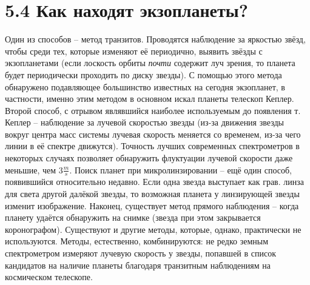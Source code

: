 \documentclass{article}
\begin{document}
\section*{5.4 Как находят экзопланеты?}
    Один из способов -- метод транзитов. Проводятся наблюдение за яркостью звёзд, чтобы среди тех, которые изменяют её периодично, выявить звёзды с экзопланетами (если лоскость орбиты \textit{почти} содержит луч зрения, то планета будет периодически проходить по диску звезды). С помощью этого метода обнаружено подавляющее большинство известных на сегодня экзопланет, в частности, именно этим методом в основном искал планеты телескоп Кеплер. Второй способ, с отрывом являвшийся наиболее используемым до появления т. Кеплер -- наблюдение за лучевой скоростью звезды (из-за движения звезды вокруг центра масс системы лучевая скорость меняется со временем, из-за чего линии в её спектре движутся). Точность лучших современных спектрометров в некоторых случаях позволяет обнаружить флуктуации лучевой скорости даже меньшие, чем 3$\frac{m}{s}$. Поиск планет при микролинзировании -- ещё один способ, появившийся относительно недавно. Если одна звезда выступает как грав. линза для света другой далёкой звезды, то возможная планета у линзирующей звезды изменит изображение. Наконец, существует метод прямого наблюдения -- когда планету удаётся обнаружить на снимке (звезда при этом закрывается коронографом). Существуют и другие методы, которые, однако, практически не используются. Методы, естественно, комбинируются: не редко земным спектрометром измеряют лучевую скорость у звезды, попавшей в список кандидатов на наличие планеты благодаря транзитным наблюдениям на космическом телескопе.
\end{document}
